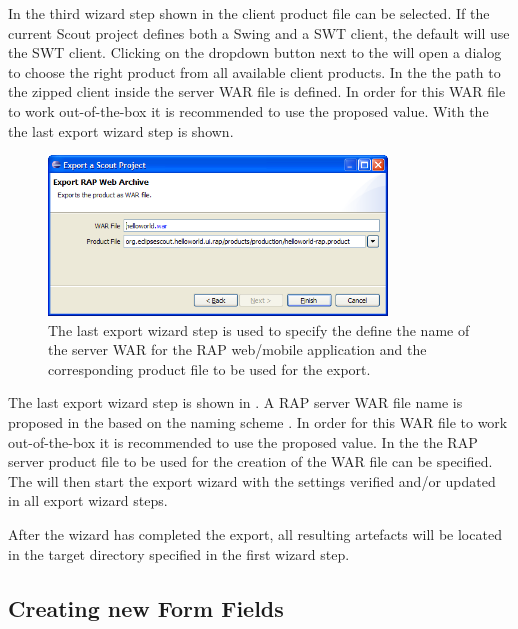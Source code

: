 \documentclass[a4paper,10pt,twoside]{book}
\begin{document}
In the third wizard step shown in  the client product file can be selected. 
If the current Scout project defines both a Swing and a SWT client, the default will use the SWT client. 
Clicking on the dropdown button next to the  will open a  dialog to choose the right product from all available client products. 
In the  the path to the zipped client inside the server WAR file is defined. 
In order for this WAR file to work out-of-the-box it is recommended to use the proposed value. 
With the  the last export wizard step is shown.

\begin{figure}
\includegraphics[width=9cm]{wizard_export_rap_server.png}
\caption{The last export wizard step is used to specify the define the name of the server WAR for the RAP web/mobile application and the corresponding product file to be used for the export.}
\end{figure}

The last export wizard step is shown in . 
A RAP server WAR file name is proposed in the  based on the naming scheme . 
In order for this WAR file to work out-of-the-box it is recommended to use the proposed value. 
In the  the RAP server product file to be used for the creation of the WAR file can be specified. 
The  will then start the export wizard with the settings verified and/or updated in all export wizard steps. 

After the wizard has completed the export, all resulting artefacts will be located in the target directory specified in the first wizard step. 

\subsection{Creating new Form Fields}
\end{document}

